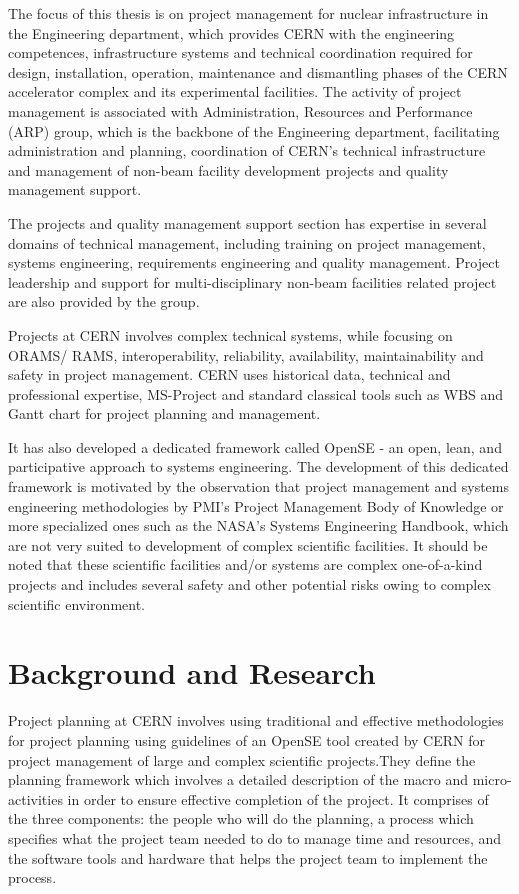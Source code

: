 The focus of this thesis is on project management for nuclear infrastructure in the Engineering department, which provides CERN with the engineering competences, infrastructure systems and technical coordination required for design, installation, operation, maintenance and dismantling phases of the CERN accelerator complex and its experimental facilities. The activity of project management is associated with Administration, Resources and Performance (ARP) group, which is the backbone of the Engineering department, facilitating administration and planning, coordination of CERN's technical infrastructure and management of non-beam facility development projects and quality management support.


The projects and quality management support section has expertise in several domains of technical management, including training on project management, systems engineering, requirements engineering and quality management. Project leadership and support for multi-disciplinary non-beam facilities related project are also provided by the group.

Projects at CERN involves complex technical systems, while focusing on ORAMS/ RAMS, interoperability, reliability, availability, maintainability and safety in project management. CERN uses historical data, technical and professional expertise, MS-Project and standard classical tools such as WBS and Gantt chart for project planning and management. 

It has also developed a dedicated framework called OpenSE - an open, lean, and participative approach to systems engineering. The development of this dedicated framework is motivated by the observation that project management and systems engineering methodologies by PMI's Project Management Body of Knowledge or more specialized ones such as the NASA's Systems Engineering Handbook, which are not very suited to development of complex scientific facilities. It should be noted that these scientific facilities and/or systems are complex one-of-a-kind projects and includes several safety and other potential risks owing to complex scientific environment. 

\section{Background and Research}

Project planning at CERN \cite{article} involves using traditional and effective methodologies for project planning using guidelines of an OpenSE tool \cite{opense} created by CERN for project management of large and complex scientific projects.They define the planning framework which involves a detailed description of the macro and micro-activities in order to ensure effective completion of the project. It comprises of the three components: the people who will do the planning, a process which specifies what the project team needed to do to manage time and resources, and the software tools and hardware that helps the project team to implement the process.

